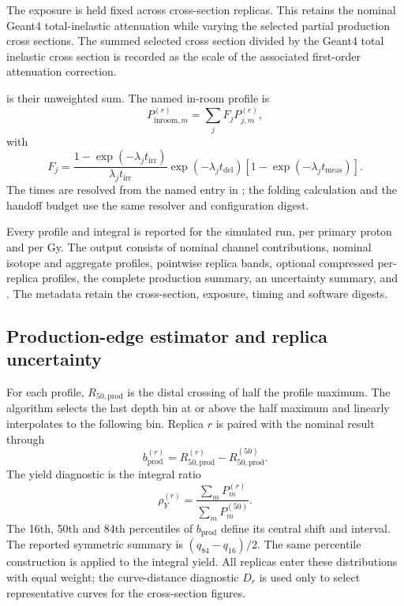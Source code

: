 \documentclass[11pt]{article}
\begin{document}
The exposure is held fixed across cross-section replicas.  This retains the
nominal Geant4 total-inelastic attenuation while varying the selected partial
production cross sections.  The summed selected cross section divided by the
Geant4 total inelastic cross section is recorded as the scale of the associated
first-order attenuation correction.

 is their unweighted sum.  The named in-room profile is
\begin{equation}
  P_{\mathrm{inroom},m}^{(r)}=
  \sum_j F_j P_{j,m}^{(r)},
  \label{eq:inroom-profile}
\end{equation}
with
\begin{equation}
  F_j=
  \frac{1-\exp(-\lambda_j t_{\mathrm{irr}})}
       {\lambda_j t_{\mathrm{irr}}}
  \exp(-\lambda_j t_{\mathrm{del}})
  [1-\exp(-\lambda_j t_{\mathrm{meas}})].
  \label{eq:handoff-factor}
\end{equation}
The times are resolved from the named  entry in
; the folding calculation and the handoff
budget use the same resolver and configuration digest.

Every profile and integral is reported for the simulated run, per primary
proton and per Gy.  The output consists of nominal channel contributions,
nominal isotope and aggregate profiles, pointwise replica bands, optional
compressed per-replica profiles, the complete production summary, an
uncertainty summary, and .  The metadata retain the
cross-section, exposure, timing and software digests.

\subsection{Production-edge estimator and replica uncertainty}

For each profile, $R_{50,\mathrm{prod}}$ is the distal crossing of half the
profile maximum.  The algorithm selects the last depth bin at or above the
half maximum and linearly interpolates to the following bin.  Replica $r$ is
paired with the nominal result through
\begin{equation}
  b_{\mathrm{prod}}^{(r)}=
  R_{50,\mathrm{prod}}^{(r)}-
  R_{50,\mathrm{prod}}^{(50)}.
  \label{eq:production-shift}
\end{equation}
The yield diagnostic is the integral ratio
\begin{equation}
  \rho_Y^{(r)}=
  \frac{\sum_m P_m^{(r)}}{\sum_m P_m^{(50)}}.
  \label{eq:yield-ratio}
\end{equation}
The 16th, 50th and 84th percentiles of $b_{\mathrm{prod}}$ define its central
shift and interval.  The reported symmetric summary is
$(q_{84}-q_{16})/2$.  The same percentile construction is applied to the
integral yield.  All replicas enter these distributions with equal weight;
the curve-distance diagnostic $D_r$ is used only to select representative
curves for the cross-section figures.
\end{document}
